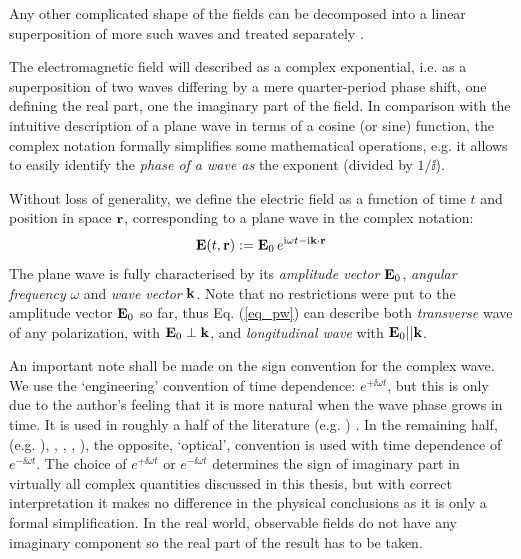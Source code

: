 Any other complicated shape of the fields can be decomposed into a linear superposition of more such waves and treated separately \cite{jackson1962book}. 

The electromagnetic field will described as a complex exponential, i.e. as a superposition of two waves differing by a mere quarter-period phase shift, one defining the real part, one the imaginary part of the field. In comparison with the intuitive description of a plane wave in terms of a cosine (or sine) function, the complex notation formally simplifies some mathematical operations, e.g. it allows to easily identify the \textit{phase of a wave as} the exponent (divided by $1/\ii$). 

 

Without loss of generality, we define the electric field as a function of time $t$ and position in space ${\mathbf{r}}$, corresponding to a plane wave in the complex notation:
\begin{equation} \mathbf{E}(t, {\mathbf{r}}) := \mathbf{E}_0\, e^{{\mathrm i}\omega t - {\mathrm i}{\mathbf{k}}\cdot{\mathbf{r}}} \label{eq_pw}\end{equation}
The plane wave is fully characterised by its \textit{amplitude vector} $\mathbf{E}_0$, \textit{angular frequency} $\omega$ and \textit{wave vector} ${\mathbf{k}}$. Note that no restrictions were put to the amplitude vector $\mathbf{E}_0$ so far, thus Eq. (\ref{eq_pw}) can describe both \textit{transverse} wave of any polarization, with $\mathbf{E}_0 \perp {\mathbf{k}}$, and \textit{longitudinal wave} with $\mathbf{E}_0 || {\mathbf{k}}$.

An important note shall be made on the sign convention for the complex wave. 
We use the `engineering' convention of time dependence: $e^{+\ii \omega t}$, but this is only due to the author's feeling that it is more natural when the wave phase grows in time. 
It is used in  roughly a half of the literature 
(e.g. \cite[p. 9]{engheta2006book}
\cite[pp. 21, 99]{krowne2007book}
\cite[chap. 1-4, 6, 9, 10]{eleftheriades2005book})
.  In the remaining half,
(e.g. \cite[chap. 5, 7, 8]{eleftheriades2005book}),
\cite{jackson1962book}, 
\cite{veselago1968},
\cite{born1999book}, \cite[p. 5]{noginov2011book}), 
the opposite, `optical', convention is used with time dependence of $e^{-\ii \omega t}$. 
The choice of $e^{+\ii\omega t}$ or $e^{-\ii\omega t}$ determines the sign of imaginary part in virtually all complex quantities discussed in this thesis, but with correct interpretation it makes no difference in the physical conclusions as it is only a formal simplification.
In the real world, observable fields do not have any imaginary component so the real part of the result has to be taken. 

